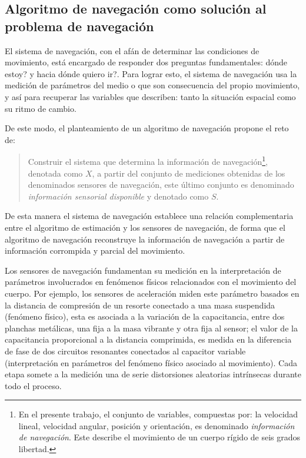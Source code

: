 \documentclass[10pt]{report}
\numberwithin{equation}{chapter}
\numberwithin{algorithm}{chapter}
\begin{document}
\subsection{Algoritmo de navegación como solución al problema de navegación}\label{RotationMatrix}
El sistema de navegación, con el afán de determinar las condiciones de movimiento, está encargado de responder dos preguntas fundamentales: dónde estoy? y hacia dónde quiero ir?. Para lograr esto, el sistema de navegación usa la medición de parámetros del medio o que son consecuencia del propio movimiento, y así para recuperar las variables que describen: tanto la situación espacial como su ritmo de cambio.\par
De este modo, el planteamiento de un algoritmo de navegación propone el reto de:
\begin{quote} Construir el sistema que determina la información de navegación\footnote{En el presente trabajo, el conjunto de variables, compuestas por: la velocidad lineal, velocidad angular, posición y orientación, es denominado \emph{información de navegación}. Este describe el movimiento de un cuerpo rígido de seis grados libertad.}, denotada como $X$, a partir del conjunto de mediciones obtenidas de los denominados sensores de navegación, este último conjunto es denominado \emph{información sensorial disponible} y denotado como $S$.
\end{quote}
De esta manera el sistema de navegación establece una relación complementaria entre el algoritmo de estimación y los sensores de navegación, de forma que el algoritmo de navegación reconstruye la información de navegación a partir de información corrompida y parcial del movimiento.\par
Los sensores de navegación fundamentan su medición en la interpretación de parámetros involucrados en fenómenos físicos relacionados con el movimiento del cuerpo. Por ejemplo, los sensores de aceleración miden este parámetro basados en la distancia de compresión de un resorte conectado a una masa suspendida (fenómeno físico), esta es asociada a la variación de la capacitancia, entre dos planchas metálicas, una fija a la masa vibrante y otra fija al sensor; el valor de la capacitancia proporcional a la distancia comprimida, es medida en la diferencia de fase de dos circuitos resonantes conectados al capacitor variable (interpretación en parámetros del fenómeno físico asociado al movimiento). Cada etapa somete a la medición una de serie distorsiones aleatorias intrínsecas durante todo el proceso.
\end{document}
